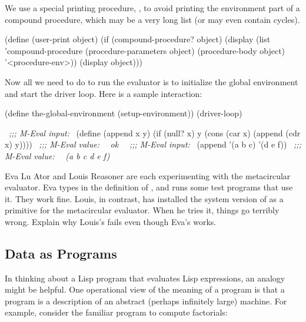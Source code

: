 \noindent
We use a special printing procedure, , to avoid printing the
environment part of a compound procedure, which may be a very long list (or may
even contain cycles).

\begin{codeBlock}
(define (user-print object)
  (if (compound-procedure? object)
      (display (list 'compound-procedure
                     (procedure-parameters object)
                     (procedure-body object)
                     '<procedure-env>))
      (display object)))
\end{codeBlock}

\noindent
Now all we need to do to run the evaluator is to initialize the global
environment and start the driver loop.  Here is a sample interaction:

\begin{codeBlock}
(define the-global-environment (setup-environment))
(driver-loop)

~\textit{;;; M-Eval input:}~
(define (append x y)
  (if (null? x)
      y
      (cons (car x) (append (cdr x) y))))
~\textit{;;; M-Eval value:}~
~\textit{ok}~
~\textit{;;; M-Eval input:}~
(append '(a b c) '(d e f))
~\textit{;;; M-Eval value:}~
~\textit{(a b c d e f)}~
\end{codeBlock}

\begin{exerciseGroup}
\label{Exercise 4.14}
 Eva Lu Ator and Louis Reasoner
are each experimenting with the metacircular evaluator.  Eva types in the
definition of , and runs some test programs that use it.  They work
fine.  Louis, in contrast, has installed the system version of  as a
primitive for the metacircular evaluator.  When he tries it, things go terribly
wrong.  Explain why Louis's  fails even though Eva's works.
\end{exerciseGroup}

\subsection{Data as Programs}
\label{Section 4.1.5}

In thinking about a Lisp program that evaluates Lisp expressions, an analogy
might be helpful.  One operational view of the meaning of a program is that a
program is a description of an abstract (perhaps infinitely large) machine.
For example, consider the familiar program to compute factorials:

